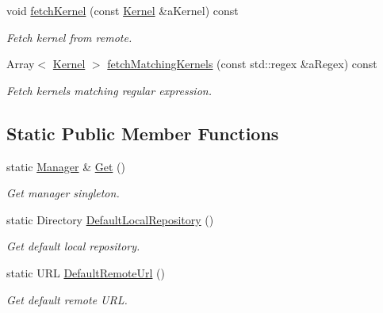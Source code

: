 \begin{DoxyCompactItemize}
void \hyperlink{classlibrary_1_1physics_1_1env_1_1ephem_1_1spice_1_1_manager_a52e06b9cc1180effbd4bdd30cc488bb4}{fetch\+Kernel} (const \hyperlink{classlibrary_1_1physics_1_1env_1_1ephem_1_1spice_1_1_kernel}{Kernel} \&a\+Kernel) const
\begin{DoxyCompactList}\small\item\em Fetch kernel from remote. \end{DoxyCompactList}\item 
Array$<$ \hyperlink{classlibrary_1_1physics_1_1env_1_1ephem_1_1spice_1_1_kernel}{Kernel} $>$ \hyperlink{classlibrary_1_1physics_1_1env_1_1ephem_1_1spice_1_1_manager_ac6f9fa45224f6f1116e66ae2c32e3e65}{fetch\+Matching\+Kernels} (const std\+::regex \&a\+Regex) const
\begin{DoxyCompactList}\small\item\em Fetch kernels matching regular expression. \end{DoxyCompactList}\end{DoxyCompactItemize}
\subsection*{Static Public Member Functions}
\begin{DoxyCompactItemize}
\item 
static \hyperlink{classlibrary_1_1physics_1_1env_1_1ephem_1_1spice_1_1_manager}{Manager} \& \hyperlink{classlibrary_1_1physics_1_1env_1_1ephem_1_1spice_1_1_manager_a3555b4555090b1140f1041d7e51ad640}{Get} ()
\begin{DoxyCompactList}\small\item\em Get manager singleton. \end{DoxyCompactList}\item 
static Directory \hyperlink{classlibrary_1_1physics_1_1env_1_1ephem_1_1spice_1_1_manager_afe6536dede2bc35e76a01ba12a203eb5}{Default\+Local\+Repository} ()
\begin{DoxyCompactList}\small\item\em Get default local repository. \end{DoxyCompactList}\item 
static U\+RL \hyperlink{classlibrary_1_1physics_1_1env_1_1ephem_1_1spice_1_1_manager_ae15505efd208b9e43550692f7620d40e}{Default\+Remote\+Url} ()
\begin{DoxyCompactList}\small\item\em Get default remote U\+RL. \end{DoxyCompactList}\end{DoxyCompactItemize}


